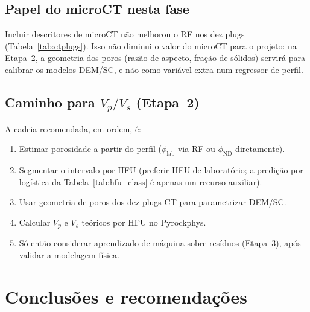 \documentclass[11pt,a4paper]{article}
\newcommand{\philab}{\ensuremath{\phi_{\mathrm{lab}}}}
\newcommand{\phiND}{\ensuremath{\phi_{\mathrm{ND}}}}
\begin{document}
\subsection{Papel do microCT nesta fase}

Incluir descritores de microCT não melhorou o RF nos dez plugs
(Tabela~\ref{tab:ctplugs}).
Isso não diminui o valor do microCT para o projeto: na Etapa~2, a
geometria dos poros (razão de aspecto, fração de sólidos) servirá
para calibrar os modelos DEM/SC, e não como variável extra num
regressor de perfil.

\subsection{Caminho para $V_p/V_s$ (Etapa~2)}

A cadeia recomendada, em ordem, é:
\begin{enumerate}
  \item Estimar porosidade a partir do perfil (\philab{} via RF ou
        \phiND{} diretamente).
  \item Segmentar o intervalo por HFU (preferir HFU de laboratório;
        a predição por logística da Tabela~\ref{tab:hfu_class} é
        apenas um recurso auxiliar).
  \item Usar geometria de poros dos dez plugs CT para parametrizar DEM/SC.
  \item Calcular $V_p$ e $V_s$ teóricos por HFU no Pyrockphys.
  \item Só então considerar aprendizado de máquina sobre resíduos
        (Etapa~3), após validar a modelagem física.
\end{enumerate}

\section{Conclusões e recomendações}
\label{sec:conclusoes}
\end{document}
